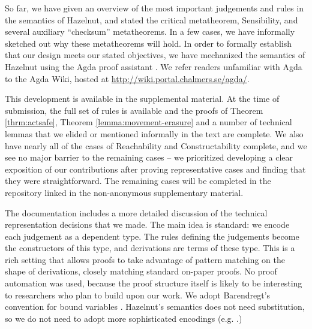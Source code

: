 So far, we have given an overview of the most important judgements and rules in
the semantics of Hazelnut, and stated the critical metatheorem, Sensibility, and several auxiliary ``checksum'' metatheorems. In a few
cases, we have informally sketched out why these metatheorems will hold. In order to formally establish that our design meets our stated objectives, we
have mechanized the semantics of Hazelnut using the Agda proof assistant \cite{norell:thesis}. We 
refer readers unfamiliar with Agda to the Agda Wiki, hosted
at \url{http://wiki.portal.chalmers.se/agda/}.

This development is available in the supplemental material. At the time of submission, the full set of rules is available and the proofs of Theorem \ref{thrm:actsafe}, Theorem \ref{lemma:movement-erasure} and a number of technical lemmas that we elided or mentioned informally in the text are complete. We also have nearly all of the cases of Reachability and Constructability complete, and we see no major barrier to the remaining cases -- we prioritized developing a clear exposition of our contributions after proving representative cases and finding that they were straightforward. The remaining cases will be completed in the repository linked in the non-anonymous supplementary material.

The documentation 
includes a more detailed discussion of the technical representation
decisions that we made. The main idea is standard: we encode each judgement as a
dependent type. The rules defining the judgements become the constructors of this
type, and derivations are terms of these type. This is a rich
setting that allows proofs to take advantage of pattern matching on the
shape of derivations, closely matching standard on-paper proofs. No proof automation was used, because the proof structure itself is likely to be interesting to researchers who plan to build upon our work. 
We adopt Barendregt's convention for
bound variables \cite{urban}. Hazelnut's semantics does not need substitution, so we do not need to adopt more sophisticated encodings (e.g. \cite{lh09unibind,Pouillard11}.)
